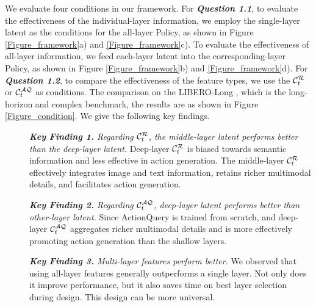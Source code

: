 We evaluate four conditions in our framework. For \textit{\textbf{Question 1.1}}, to evaluate the effectiveness of the individual-layer information, we employ the single-layer latent as the conditions for the all-layer Policy, as shown in Figure \ref{Figure_framework}a) and \ref{Figure_framework}c). To evaluate the effectiveness of all-layer information, we feed each-layer latent into the corresponding-layer Policy, as shown in Figure \ref{Figure_framework}b) and \ref{Figure_framework}d). For \textit{\textbf{Question 1.2}}, to compare the effectiveness of the feature types, we use the $\mathcal{{\cal C}}_t^\mathcal{R}$ or $\mathcal{{\cal C}}_t^\mathcal{AQ}$ as conditions. The comparison on the LIBERO-Long \citep{LIBERO-2023}, which is the long-horizon and complex benchmark, the results are as shown in Figure \ref{Figure_condition}. We give the following key findings.


\begin{description}
	\item[] \thinspace \textit{\textbf{Key Finding 1.} Regarding $\mathcal{{\cal C}}_t^\mathcal{R}$, the middle-layer latent performs better than the deep-layer latent.} Deep-layer $\mathcal{{\cal C}}_t^\mathcal{R}$ is biased towards semantic information and less effective in action generation. The middle-layer $\mathcal{{\cal C}}_t^\mathcal{R}$ effectively integrates image and text information, retains richer multimodal details, and facilitates action generation.
\end{description}

\begin{description}
	\item[] \thinspace \textit{\textbf{Key Finding 2.} Regarding $\mathcal{{\cal C}}_t^\mathcal{AQ}$, deep-layer latent performs better than other-layer latent.} Since ActionQuery is trained from scratch, and deep-layer $\mathcal{{\cal C}}_t^\mathcal{AQ}$ aggregates richer multimodal details and is more effectively promoting action generation than the shallow layers.
\end{description}

\begin{description}
	\item[] \thinspace \textit{\textbf{Key Finding 3.} Multi-layer features perform better.} We observed that using all-layer features generally outperforms a single layer. Not only does it improve performance, but it also saves time on best layer selection during design. This design can be more universal.
\end{description}

